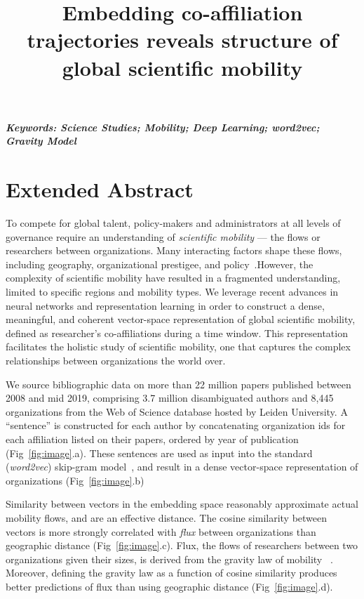 \documentclass[a4paper,12pt]{article}
\title{Embedding co-affiliation trajectories reveals structure of global scientific mobility}
\author[]{} %
\date{}
\begin{document}
\maketitle
\thispagestyle{fancy}

\vspace{-6em}
\begin{center}
\textbf{\textit{Keywords: Science Studies; Mobility; Deep Learning; word2vec; Gravity Model}}
\newline
\end{center}

\section*{Extended Abstract}
To compete for global talent, policy-makers and administrators at all levels of governance require an understanding of \textit{scientific mobility} — the flows or researchers between organizations. 
Many interacting factors shape these flows, including geography, organizational prestigee, and policy~\autocite{deville_career_2014, clauset_systematic_2015}.However, the complexity of scientific mobility have resulted in a fragmented understanding, limited to specific regions and mobility types.
We leverage recent advances in neural networks and representation learning in order to construct a dense, meaningful, and coherent vector-space representation of global scientific mobility, defined as researcher's co-affiliations during a time window. 
This representation facilitates the holistic study of scientific mobility, one that captures the complex relationships between organizations the world over. 

We source bibliographic data on more than 22 million papers published between 2008 and mid 2019, comprising 3.7 million disambiguated authors and 8,445 organizations from the Web of Science database hosted by Leiden University. 
A ``sentence'' is constructed for each author by concatenating organization ids for each affiliation listed on their papers, ordered by year of publication (Fig~\ref{fig:image}.a).
These sentences are used as input into the standard (\textit{word2vec}) skip-gram model~\autocite{mikolov_distributed_2013}, and result in a dense vector-space representation of organizations (Fig~\ref{fig:image}.b) 

Similarity between vectors in the embedding space reasonably approximate actual mobility flows, and are an effective distance. 
The cosine similarity between vectors is more strongly correlated with \textit{flux} between organizations than geographic distance (Fig~\ref{fig:image}.c). 
Flux, the flows of researchers between two organizations given their sizes, is derived from the gravity law of mobility ~\autocite{simini_universal_2012}.
Moreover, defining the gravity law as a function of cosine similarity produces better predictions of flux than using geographic distance (Fig~\ref{fig:image}.d). 
\end{document}
